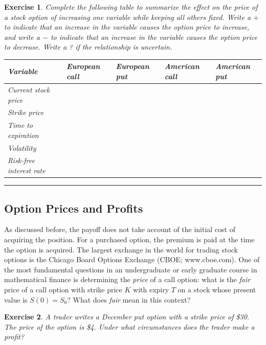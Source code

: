 \documentclass[letterpaper,10pt]{article}
\newtheorem{ex}{Exercise}
\begin{document}
\begin{ex}
Complete the following table to summarize the effect on the price of a stock option of increasing one variable while keeping all others fixed.  Write a $+$ to indicate that an increase in the variable causes the option price to increase, and write a $-$ to indicate that an increase in the variable causes the option price to decrease.  Write a ? if the relationship is uncertain.

\bigskip

\begin{tabular}{|l|l|l|l|l|}\hline
{\em Variable} & {\em European call} & {\em European put} & {\em American call} & {\em American put}\\\hline
Current stock price &&&&\\\hline
Strike price &&&&\\\hline
Time to expiration &&&&\\\hline
Volatility &&&&\\\hline
Risk-free interest rate &&&&\\\hline
\end{tabular}
\end{ex}

\bigskip

\hrule

\bigskip

\subsection{Option Prices and Profits}

\noindent As discussed before, the payoff does not take account of the initial cost of acquiring the position. For a purchased option, the premium is paid at the time the option is acquired.  The largest exchange in the world for trading stock options is the Chicago Board Options Exchange (CBOE; www.cboe.com).  One of the most fundamental questions in an undergraduate or early graduate course in mathematical finance is determining the {\em price} of a call option: what is the {\em fair} price of a call option with strike price $K$ with expiry $T$ on a stock whose present value is $S(0)=S_0$?  What does {\em fair} mean in this context?


\begin{ex}
A trader writes a December put option with a strike price of \$30.  The price of the option is \$4.  Under what circumstances does the trader make a profit?
\end{ex}
\end{document}
